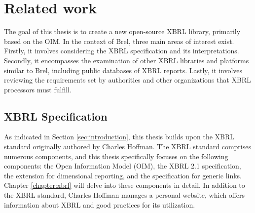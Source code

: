 \chapter{Related work}
\label{sec:related_work}

The goal of this thesis is to create a new open-source XBRL library, primarily based on the OIM.
In the context of Brel, three main areas of interest exist.
Firstly, it involves considering the XBRL specification and its interpretations.
Secondly, it encompasses the examination of other XBRL libraries and platforms similar to Brel, including public databases of XBRL reports.
Lastly, it involves reviewing the requirements set by authorities and other organizations that XBRL processors must fulfill.

\section{XBRL Specification}
As indicated in Section \ref{sec:introduction}, this thesis builds upon the XBRL standard originally authored by Charles Hoffman\cite{xbrl}.
The XBRL standard comprises numerous components, and this thesis specifically focuses on the following components: 
the Open Information Model (OIM)\cite{oim}, 
the XBRL 2.1 specification\cite{xbrl21}, 
the extension for dimensional reporting\cite{xbrl_dimensions}, 
and the specification for generic links\cite{xbrl_generic_links}.
Chapter \ref{chapter:xbrl} will delve into these components in detail.
In addition to the XBRL standard, Charles Hoffman manages a personal website\cite{seattle_method},
which offers information about XBRL and good practices for its utilization.

